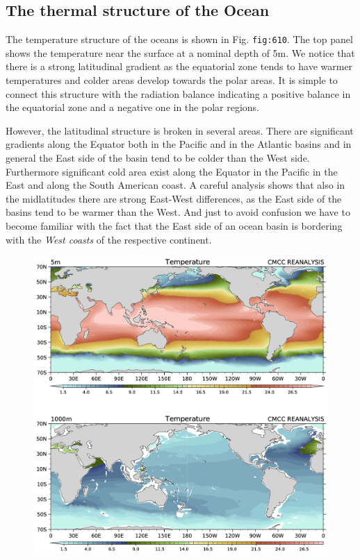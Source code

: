 \subsection{The thermal structure of the
Ocean}\label{the-thermal-structure-of-the-ocean}

The temperature structure of the oceans is shown in Fig.
\texttt{fig:610}. The top panel shows the temperature near the surface
at a nominal depth of 5m. We notice that there is a strong latitudinal
gradient as the equatorial zone tends to have warmer temperatures and
colder areas develop towards the polar areas. It is simple to connect
this structure with the radiation balance indicating a positive balance
in the equatorial zone and a negative one in the polar regions.

However, the latitudinal structure is broken in several areas. There are
significant gradients along the Equator both in the Pacific and in the
Atlantic basins and in general the East side of the basin tend to be
colder than the West side. Furthermore significant cold area exist along
the Equator in the Pacific in the East and along the South American
coast. A careful analysis shows that also in the midlatitudes there are
strong East-West differences, as the East side of the basins tend to be
warmer than the West. And just to avoid confusion we have to become
familiar with the fact that the East side of an ocean basin is bordering
with the \emph{West coasts} of the respective continent.

\begin{figure}
\centering
\includegraphics[width = .7 \textwidth]{figs/GD/Temp5-1000.png}
\caption{} \label{fig:}
\end{figure}

